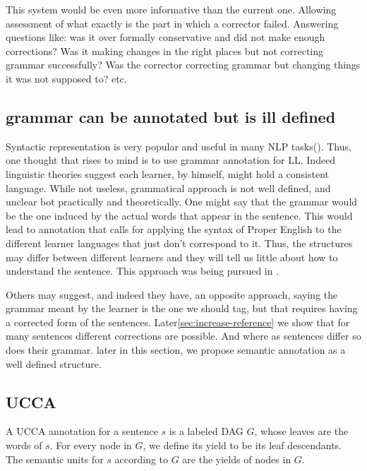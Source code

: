 \documentclass[english]{article}
\begin{document}
This system would be even more informative than the current one. Allowing assessment of
what exactly is the part in which a corrector failed. Answering questions
like: was it over formally conservative and did not make enough corrections?
Was it making changes in the right places but not correcting grammar
successfully? Was the corrector correcting grammar but changing things
it was not supposed to? etc.

\subsection{grammar can be annotated but is ill defined}

Syntactic representation is very popular and useful in many NLP tasks(\cite{mesfar2007named,ng2002improving,zollmann2006syntax}).
Thus, one thought that rises to mind is to use grammar annotation
for LL. Indeed linguistic theories suggest each learner, by himself, might hold a consistent language\cite{huebner1985system,tarone1983variability}. While not useless, grammatical approach is not well
defined, and unclear bot practically and theoretically. One might
say that the grammar would be the one induced by the actual words
that appear in the sentence. This would lead to annotation that calls
for applying the syntax of Proper English to the different learner
languages that just don't correspond to it. Thus, the structures may
differ between different learners and they will tell us little about
how to understand the sentence. This approach was being pursued in
\cite{berzak2016universal,ragheb2012defining}. 

Others may suggest, and indeed they have\cite{nagataphrase}, an opposite
approach, saying the grammar meant by the learner is the one we should
tag, but that requires having a corrected form of the sentences. Later\ref{sec:increase-reference}
we show that for many sentences different corrections are possible.
And where as sentences differ so does their grammar. later in this
section, we propose semantic annotation as a well defined structure.

\subsection{UCCA}
A UCCA annotation for a sentence $s$ is a labeled DAG $G$, whose
leaves are the words of $s$. For every node in $G$,
we define its yield to be its leaf descendants. The
semantic units for $s$ according to $G$ are the yields
of nodes in $G$.
\end{document}
